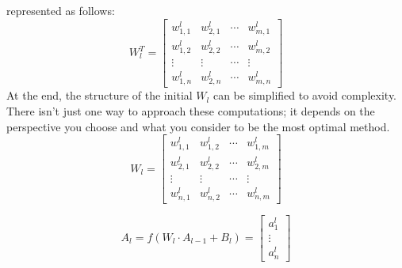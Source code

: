 represented as follows:
\[
W_l^T = \begin{bmatrix} w_{1, 1}^l & w_{2, 1}^l & \cdots & w_{m, 1}^l \\
  w_{1, 2}^l & w_{2, 2}^l & \cdots & w_{m, 2}^l \\
  \vdots & \vdots & \cdots & \vdots \\
  w_{1, n}^l & w_{2, n}^l & \cdots & w_{m, n}^l
\end{bmatrix}
\]
At the end, the structure of the initial $W_l$ can be simplified to avoid complexity. There isn't just one
way to approach these computations; it depends on the perspective you choose and what you consider to be the
most optimal method.
\[
W_l = \begin{bmatrix} w_{1, 1}^l & w_{1, 2}^l & \cdots & w_{1, m}^l \\
  w_{2, 1}^l & w_{2, 2}^l & \cdots & w_{2, m}^l \\
  \vdots & \vdots & \cdots & \vdots \\
  w_{n, 1}^l & w_{n, 2}^l & \cdots & w_{n, m}^l
\end{bmatrix}
\]

\[
A_l = f(W_l \cdot A_{l - 1} + B_l) = \begin{bmatrix} a_{1}^l \\ \vdots \\ a_{n}^l \end{bmatrix}
\]


